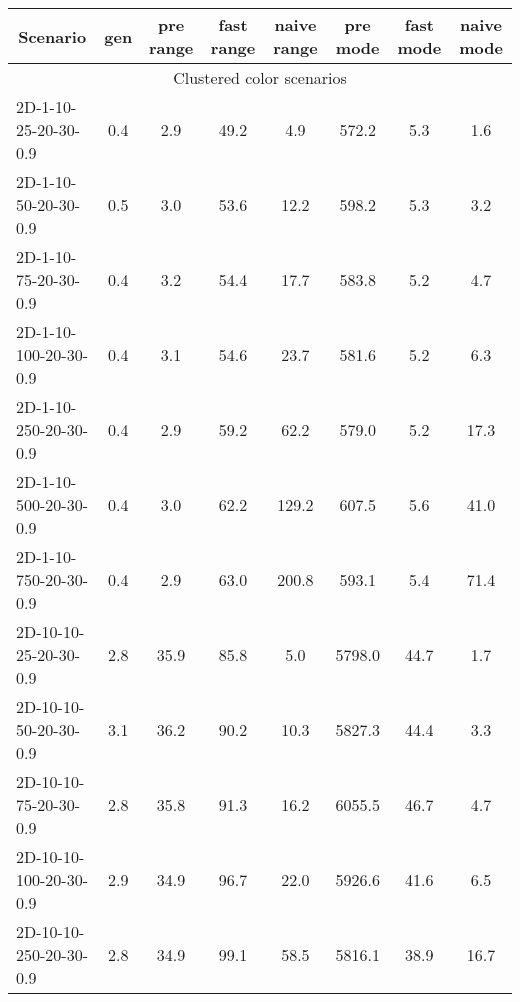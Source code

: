 \documentclass{article}
\begin{document}
\begin{table}[h]
    \begin{center}
        \begin{tabular}{|l||c|c|c|c|c|c|c|}
            \hline
            \multicolumn{1}{|c|}{Scenario} & gen  & pre range & fast range & naive range & pre mode & fast mode & naive mode \\
            \hline
            \hline
            \multicolumn{8}{|c|}{Clustered color scenarios}                                                                  \\
            \hline
            2D-1-10-25-20-30-0.9           & 0.4  & 2.9       & 49.2       & 4.9         & 572.2    & 5.3       & 1.6        \\
            2D-1-10-50-20-30-0.9           & 0.5  & 3.0       & 53.6       & 12.2        & 598.2    & 5.3       & 3.2        \\
            2D-1-10-75-20-30-0.9           & 0.4  & 3.2       & 54.4       & 17.7        & 583.8    & 5.2       & 4.7        \\
            2D-1-10-100-20-30-0.9          & 0.4  & 3.1       & 54.6       & 23.7        & 581.6    & 5.2       & 6.3        \\
            2D-1-10-250-20-30-0.9          & 0.4  & 2.9       & 59.2       & 62.2        & 579.0    & 5.2       & 17.3       \\
            2D-1-10-500-20-30-0.9          & 0.4  & 3.0       & 62.2       & 129.2       & 607.5    & 5.6       & 41.0       \\
            2D-1-10-750-20-30-0.9          & 0.4  & 2.9       & 63.0       & 200.8       & 593.1    & 5.4       & 71.4       \\
            \hline
            2D-10-10-25-20-30-0.9          & 2.8  & 35.9      & 85.8       & 5.0         & 5798.0   & 44.7      & 1.7        \\
            2D-10-10-50-20-30-0.9          & 3.1  & 36.2      & 90.2       & 10.3        & 5827.3   & 44.4      & 3.3        \\
            2D-10-10-75-20-30-0.9          & 2.8  & 35.8      & 91.3       & 16.2        & 6055.5   & 46.7      & 4.7        \\
            2D-10-10-100-20-30-0.9         & 2.9  & 34.9      & 96.7       & 22.0        & 5926.6   & 41.6      & 6.5        \\
            2D-10-10-250-20-30-0.9         & 2.8  & 34.9      & 99.1       & 58.5        & 5816.1   & 38.9      & 16.7       \\

\end{tabular}
\end{center}
\end{table}
\end{document}
